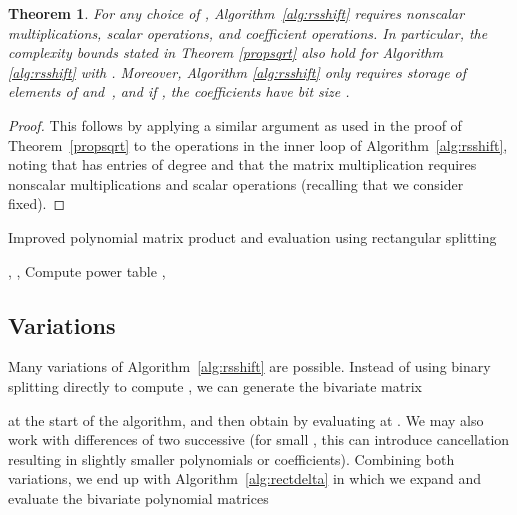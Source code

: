 \documentclass{sig-alternate}
\newtheorem{theorem}{Theorem}
\begin{document}
\begin{theorem}
For any choice of , Algorithm~\ref{alg:rsshift} requires
 nonscalar multiplications,
 scalar operations, and  coefficient operations.
In particular, the complexity bounds stated in Theorem \ref{propsqrt}
also hold for Algorithm \ref{alg:rsshift} with .
Moreover, Algorithm \ref{alg:rsshift} only
requires storage of  elements of  and~,
and if , the coefficients have bit size .
\end{theorem}

\begin{proof}
This follows by applying a similar argument as used in the proof of
Theorem~\ref{propsqrt}
to the operations in the inner loop of Algorithm~\ref{alg:rsshift},
noting that  has entries of degree 
and that the matrix multiplication 
requires  nonscalar multiplications and scalar
operations (recalling that we consider  fixed).
\end{proof}

\begin{algorithm}
  \caption{Improved polynomial matrix product and evaluation using rectangular splitting}
  \label{alg:rsshift}
  \begin{algorithmic}[1]
    \Require , , 
    \Ensure 
    \State Compute power table , 
    \State  {}
    \For{}
        \State 
        \Statex {}
        \State  {}
        \State  {}
        \State  {}
    \EndFor
    \State \Return{}
  \end{algorithmic}
\end{algorithm}

\subsection{Variations}

Many variations of Algorithm~\ref{alg:rsshift}
are possible. Instead of using binary
splitting directly to compute , we can generate the bivariate matrix

at the start of the algorithm, and then
obtain  by evaluating  at .
We may also work with differences of two successive 
(for small , this can introduce cancellation
resulting in slightly smaller polynomials or coefficients).
Combining both variations, we end up with Algorithm~\ref{alg:rectdelta}
in which we expand and evaluate the bivariate polynomial matrices
\end{document}
